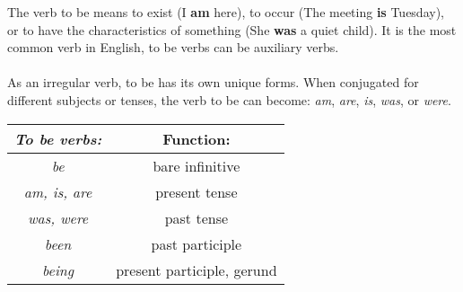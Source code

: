 The verb to be means to exist (I \textbf{am} here), to occur (The meeting \textbf{is} Tuesday), 
or to have the characteristics of something (She \textbf{was} a quiet child). 
It is the most common verb in English, to be verbs can be auxiliary verbs.\\\\
As an irregular verb, to be has its own unique forms. 
When conjugated for different subjects or tenses, the verb to be can become: 
\textit{am}, \textit{are}, \textit{is}, \textit{was}, or \textit{were}.
\begin{center}
\begin{tabular}{|c|c|}\hline
    \textit{\textbf{To be verbs:}} & \textbf{Function:}         \\\hline
    \textit{be}                    & bare infinitive            \\\hline
    \textit{am, is, are}           & present tense              \\\hline
    \textit{was, were}             & past tense                 \\\hline
    \textit{been}                  & past participle            \\\hline
    \textit{being}                 & present participle, gerund \\\hline
\end{tabular}
\end{center}